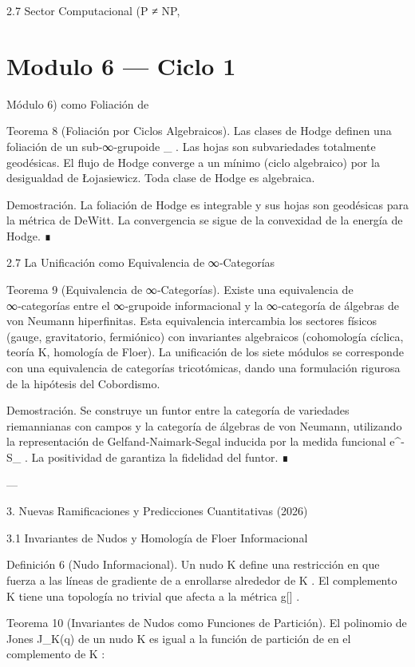 \documentclass[12pt,twoside]{book}
\begin{document}
2.7 Sector Computacional (P ≠ NP, 

\chapter{Modulo 6 — Ciclo 1}
Módulo 6) como Foliación de   

Teorema 8 (Foliación por Ciclos Algebraicos). Las clases de Hodge definen una foliación de un sub‑∞‑grupoide  _{} . Las hojas son subvariedades totalmente geodésicas. El flujo de Hodge converge a un mínimo (ciclo algebraico) por la desigualdad de Łojasiewicz. Toda clase de Hodge es algebraica.

Demostración. La foliación de Hodge es integrable y sus hojas son geodésicas para la métrica de DeWitt. La convergencia se sigue de la convexidad de la energía de Hodge. ∎

2.7 La Unificación como Equivalencia de ∞‑Categorías

Teorema 9 (Equivalencia de ∞‑Categorías). Existe una equivalencia de ∞‑categorías entre el ∞‑grupoide informacional    y la ∞‑categoría de álgebras de von Neumann hiperfinitas. Esta equivalencia intercambia los sectores físicos (gauge, gravitatorio, fermiónico) con invariantes algebraicos (cohomología cíclica, teoría K, homología de Floer). La unificación de los siete módulos se corresponde con una equivalencia de categorías tricotómicas, dando una formulación rigurosa de la hipótesis del Cobordismo.

Demostración. Se construye un funtor entre la categoría de variedades riemannianas con campos  \rho  y la categoría de álgebras de von Neumann, utilizando la representación de Gelfand‑Naimark‑Segal inducida por la medida funcional  e^{-S_{}} . La positividad de  \rho  garantiza la fidelidad del funtor. ∎

---

3. Nuevas Ramificaciones y Predicciones Cuantitativas (2026)

3.1 Invariantes de Nudos y Homología de Floer Informacional

Definición 6 (Nudo Informacional). Un nudo  K \subset {}  define una restricción en  \rho  que fuerza a las líneas de gradiente de  \rho  a enrollarse alrededor de  K . El complemento  \setminus K  tiene una topología no trivial que afecta a la métrica  g[\rho] .

Teorema 10 (Invariantes de Nudos como Funciones de Partición). El polinomio de Jones  J_K(q)  de un nudo  K  es igual a la función de partición de  \rho  en el complemento de  K :
\end{document}
